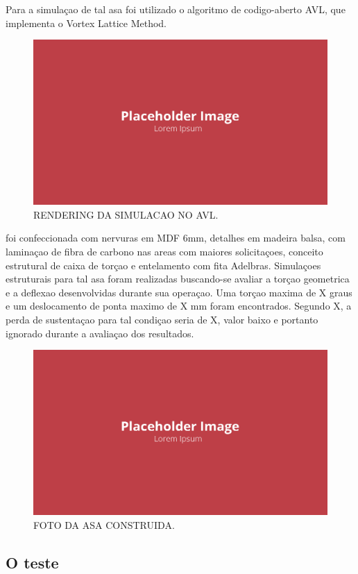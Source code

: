 Para a simulaçao de tal asa foi utilizado o algoritmo de codigo-aberto AVL, que implementa o Vortex Lattice Method.

\begin{figure}[!ht]
    \centering
    \includegraphics[width=.8\linewidth]{figuras/placeholder.png}
    \caption{RENDERING DA SIMULACAO NO AVL\cite{autor}.}
    \label{fig:placeholder}
\end{figure}

foi confeccionada com nervuras em MDF 6mm, detalhes em madeira balsa, com laminaçao de fibra de carbono nas areas com maiores solicitaçoes, conceito estrutural de caixa de torçao e entelamento com fita Adelbras. Simulaçoes estruturais para tal asa foram realizadas buscando-se avaliar a torçao geometrica e a deflexao desenvolvidas durante sua operaçao. Uma torçao maxima de X graus e um deslocamento de ponta maximo de X mm foram encontrados. Segundo X, a perda de sustentaçao para tal condiçao seria de X, valor baixo e portanto ignorado durante a avaliaçao dos resultados.

\begin{figure}[!ht]
    \centering
    \includegraphics[width=.8\linewidth]{figuras/placeholder.png}
    \caption{FOTO DA ASA CONSTRUIDA\cite{autor}.}
    \label{fig:placeholder}
\end{figure}

\subsection{O teste}

